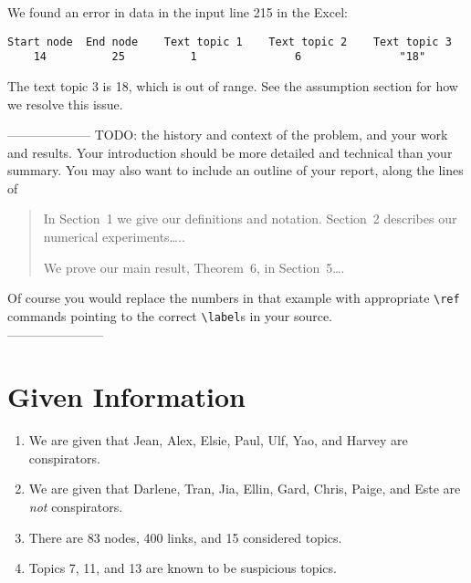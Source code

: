 \documentclass{icmmcm}
\begin{document}
We found an error in data in the input line 215 in the Excel:
\begin{verbatim}
Start node	End node	Text topic 1	Text topic 2	Text topic 3
	14			25			1				6				"18"
\end{verbatim}
The text topic 3 is 18, which is out of range.
See the assumption section for how we resolve this issue.

\noindent -------------------- TODO:
the history and context of the problem,
and your work and results.  Your introduction should be more detailed
and technical than your summary.  You may also want to include an
outline of your report, along the lines of
\begin{quotation}
  In Section~1 we give our definitions and notation. Section~2
  describes our numerical experiments\ldots{}..
  
  We prove our main result, Theorem~6, in Section~5\ldots{}.
\end{quotation}
Of course you would replace the numbers in that example with
appropriate \verb|\ref| commands pointing to the correct
\verb|\label|s in your source.\\
-----------------------

\section{Given Information}
\begin{enumerate}
\item We are given that Jean, Alex, Elsie, Paul, Ulf, Yao,
and Harvey are conspirators.
\item We are given that Darlene, Tran, Jia, Ellin, Gard, Chris,
Paige, and Este are \textit{not} conspirators.
\item There are 83 nodes, 400 links, and 15 considered topics.
\item Topics 7, 11, and 13 are known to be suspicious topics.
\end{enumerate}
\end{document}

